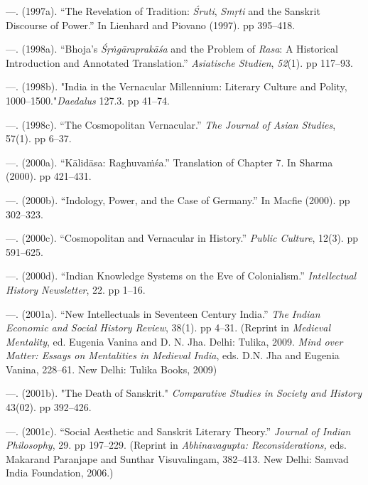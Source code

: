  \item —. (1997a). “The Revelation of Tradition: \textit{Śruti}, \textit{Smṛti} and the Sanskrit Discourse of Power.” In Lienhard and Piovano (1997). pp 395–418.

 \item —. (1998a). “Bhoja's \textit{Śṛṅgāraprakāśa} and the Problem of \textit{Rasa}: A Historical Introduction and Annotated Translation.” \textit{Asiatische Studien}, \textit{52}(1). pp 117–93.

 \item —. (1998b). "India in the Vernacular Millennium: Literary Culture and Polity, 1000–1500."\textit{Daedalus} 127.3. pp 41–74.

 \item —. (1998c). “The Cosmopolitan Vernacular.” \textit{The Journal of Asian Studies}, 57(1). pp 6–37.

 \item —. (2000a). “Kālidāsa: Raghuvaṁśa.” Translation of Chapter 7. In Sharma (2000). pp 421–431.

 \item —. (2000b). “Indology, Power, and the Case of Germany.” In Macfie (2000). pp 302–323.

 \item —. (2000c). “Cosmopolitan and Vernacular in History.” \textit{Public Culture}, 12(3). pp 591–625.

 \item —. (2000d). “Indian Knowledge Systems on the Eve of Colonialism.” \textit{Intellectual History Newsletter}, 22. pp 1–16.

 \item —. (2001a). “New Intellectuals in Seventeen Century India.” \textit{The Indian Economic and Social History Review}, 38(1). pp 4–31. (Reprint in \textit{Medieval Mentality}, ed. Eugenia Vanina and D. N. Jha. Delhi: Tulika, 2009. \textit{Mind over Matter: Essays on Mentalities in Medieval India}, eds. D.N. Jha and Eugenia Vanina, 228–61. New Delhi: Tulika Books, 2009)

 \item —. (2001b). "The Death of Sanskrit." \textit{Comparative Studies in Society and History} 43(02). pp 392–426.

 \item —. (2001c). “Social Aesthetic and Sanskrit Literary Theory.” \textit{Journal of Indian Philosophy}, 29. pp 197–229. (Reprint in \textit{Abhinavagupta: Reconsiderations, }eds. Makarand Paranjape and Sunthar Visuvalingam, 382–413. New Delhi: Samvad India Foundation, 2006.)


